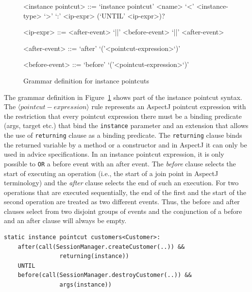 \documentclass{acm_proc_article-sp}
\begin{document}
\begin{figure}[h!]
\begin{grammar}
<instance pointcut> ::= `instance pointcut' <name> `<' <instance-type> `>' `:'
<ip-expr> (`UNTIL' <ip-expr>)? 

<ip-expr> ::= <after-event> `||' <before-event>  `||' <after-event>  

<after-event> ::= `after' `('<pointcut-expression>`)'

<before-event> ::= `before' `('<pointcut-expression>`)'
\end{grammar}
\caption{Grammar definition for instance pointcuts}
\label{fig:grammar1}
\end{figure}

The grammar definition in Figure~\ref{fig:grammar1} shows part of the instance pointcut syntax. 
The $\langle pointcut-expression\rangle$ rule represents an AspectJ pointcut expression with the restriction that every pointcut expression there must be a binding predicate (args, target etc.) that bind the \texttt{instance} parameter and an extension that allows the use of \texttt{returning} clause as a binding predicate. The \texttt{returning} clause binds the returned variable by a method or a constructor and in AspectJ it can only be used in advice specifications. 
In an instance pointcut expression, it is only possible to \texttt{OR} a before event with an after event. 
The \emph{before} clause selects the start of executing an operation (i.e., the start of a join point in AspectJ terminology) and the \emph{after} clause selects the end of such an execution. 
For two operations that are executed sequentially, the end of the first and the start of the second operation are treated as two different events. Thus, the before and after clauses select from two disjoint groups of events and the conjunction of a before and an after clause will always be empty.



\begin{lstlisting}[float=h!, caption={A basic instance pointcut declaration with add and remove expressions}, label={lst:basic}]
static instance pointcut customers<Customer>: 
	after(call(SessionManager.createCustomer(..)) && 
				returning(instance)) 
	UNTIL 
	before(call(SessionManager.destroyCustomer(..)) && 
				args(instance))
\end{lstlisting}
\end{document}
